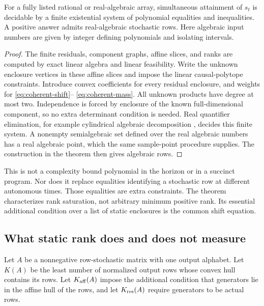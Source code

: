 \begin{corollary}\label{cor:algebraic}
For a fully listed rational or real-algebraic array, simultaneous
attainment of $s_t$ is decidable by a finite existential system of
polynomial equalities and inequalities. A positive answer admits
real-algebraic stochastic rows. Here algebraic input numbers are given
by integer defining polynomials and isolating intervals.
\end{corollary}
\begin{proof}
The finite residuals, component graphs, affine slices, and ranks are
computed by exact linear algebra and linear feasibility. Write the
unknown enclosure vertices in these affine slices and impose the linear
causal-polytope constraints. Introduce convex coefficients for every
residual enclosure, and weights for \eqref{eq:coherent-shift}--
\eqref{eq:coherent-mass}. All unknown products have degree at most two.
Independence is forced by enclosure of the known full-dimensional
component, so no extra determinant condition is needed. Real quantifier
elimination, for example cylindrical algebraic decomposition
\cite{Collins,Davenport}, decides this finite system. A nonempty
semialgebraic set defined over the real algebraic numbers has a real
algebraic point, which the same sample-point procedure supplies.
The construction in the theorem then gives algebraic rows.
\end{proof}
This is not a complexity bound polynomial in the horizon or in a
succinct program. Nor does it replace equalities identifying a stochastic
row at different autonomous times. Those equalities are extra constraints.
The theorem characterizes rank saturation, not arbitrary minimum positive
rank. Its essential additional condition over a list of static enclosures
is the common shift equation.

\subsection{What static rank does and does not measure}
Let $A$ be a nonnegative row-stochastic matrix with one output alphabet.
Let $K(A)$ be the least number of normalized output rows whose convex
hull contains its rows. Let $K_{\rm aff}(A)$ impose the additional
condition that generators lie in the affine hull of the rows, and let
$K_{\rm res}(A)$ require generators to be actual rows.

